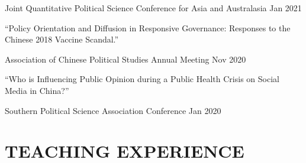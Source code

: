 \documentclass[10.5pt,]{article}
\providecommand{\tightlist}{%
	\setlength{\itemsep}{0pt}\setlength{\parskip}{0pt}}
\renewenvironment{itemize}{
	\begin{list}{}{
			\setlength{\leftmargin}{1.5em}
		}
	}{
	\end{list}
}
\begin{document}
\begin{itemize}
  \begin{itemize}
  \tightlist
  \item
    Joint Quantitative Political Science Conference for Asia and
    Australasia \hfill Jan 2021
  \end{itemize}
\item
  ``Policy Orientation and Diffusion in Responsive Governance: Responses
  to the Chinese 2018 Vaccine Scandal.''

  \begin{itemize}
  \tightlist
  \item
    Association of Chinese Political Studies Annual Meeting \hfill Nov
    2020
  \end{itemize}
\item
  ``Who is Influencing Public Opinion during a Public Health Crisis on
  Social Media in China?''

  \begin{itemize}
  \tightlist
  \item
    Southern Political Science Association Conference \hfill  Jan 2020
  \end{itemize}
\end{itemize}

\section{TEACHING EXPERIENCE}\label{teaching-experience}
\end{document}
